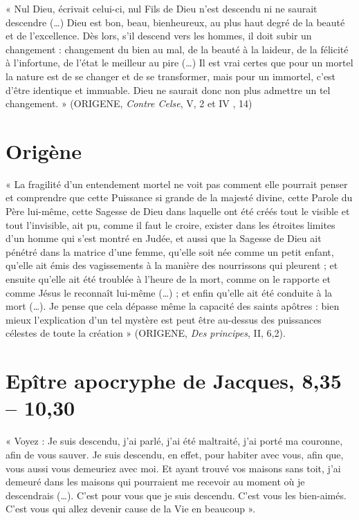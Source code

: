 « Nul Dieu, écrivait celui-ci, nul Fils de Dieu n'est descendu ni ne
saurait descendre (\ldots) Dieu est bon, beau, bienheureux, au plus haut
degré de la beauté et de l'excellence. Dès lors, s'il descend vers les
hommes, il doit subir un changement : changement du bien au mal, de la
beauté à la laideur, de la félicité à l'infortune, de l'état le meilleur
au pire (\ldots) Il est vrai certes que pour un mortel la nature est de
se changer et de se transformer, mais pour un immortel, c'est d'être
identique et immuable. Dieu ne saurait donc non plus admettre un tel
changement. » (ORIGENE, \emph{Contre Celse}, V, 2 et IV , 14)


\hypertarget{origuxe8ne}{%
\section{Origène}\label{origuxe8ne}}


« La fragilité d'un entendement mortel ne voit pas comment elle pourrait
penser et comprendre que cette Puissance si grande de la majesté divine,
cette Parole du Père lui-même, cette Sagesse de Dieu dans laquelle ont
été créés tout le visible et tout l'invisible, ait pu, comme il faut le
croire, exister dans les étroites limites d'un homme qui s'est montré en
Judée, et aussi que la Sagesse de Dieu ait pénétré dans la matrice d'une
femme, qu'elle soit née comme un petit enfant, qu'elle ait émis des
vagissements à la manière des nourrissons qui pleurent ; et ensuite
qu'elle ait été troublée à l'heure de la mort, comme on le rapporte et
comme Jésus le reconnaît lui-même (\ldots) ; et enfin qu'elle ait été
conduite à la mort (\ldots). Je pense que cela dépasse même la capacité
des saints apôtres : bien mieux l'explication d'un tel mystère est peut
être au-dessus des puissances célestes de toute la création » (ORIGENE,
\emph{Des principes}, II, 6,2).


\hypertarget{epuxeetre-apocryphe-de-jacques-835-1030}{%
\section{Epître apocryphe de Jacques, 8,35 --
10,30}\label{epuxeetre-apocryphe-de-jacques-835-1030}}


« Voyez : Je suis descendu, j'ai parlé, j'ai été maltraité, j'ai porté
ma couronne, afin de vous sauver. Je suis descendu, en effet, pour
habiter avec vous, afin que, vous aussi vous demeuriez avec moi. Et
ayant trouvé vos maisons sans toit, j'ai demeuré dans les maisons qui
pourraient me recevoir au moment où je descendrais (\ldots). C'est pour
vous que je suis descendu. C'est vous les bien-aimés. C'est vous qui
allez devenir cause de la Vie en beaucoup ».


